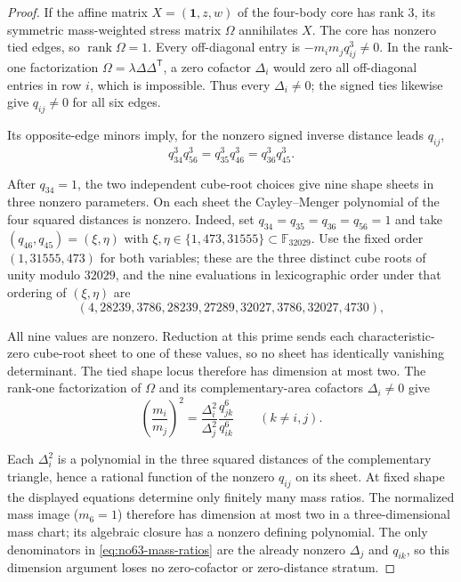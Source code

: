 \documentclass[11pt]{amsart}
\theoremstyle{remark}
\newcommand{\Needspace}[1]{\par\ifdim\dimexpr\pagegoal-\pagetotal\relax<#1\newpage\fi}
\begin{document}
\begin{proof}

If the affine matrix $X=(\boldsymbol1,z,w)$ of the four-body
core has rank 3, its symmetric mass-weighted stress matrix
$\Omega$ annihilates $X$. The core has nonzero tied edges, so
$\operatorname{rank}\Omega=1$. Every off-diagonal entry is
$-m_im_jq_{ij}^3\ne0$. In the rank-one factorization
$\Omega=\lambda\Delta\Delta^{\mathsf T}$, a zero cofactor
$\Delta_i$ would zero all off-diagonal entries in row $i$,
which is impossible. Thus every $\Delta_i\ne0$; the signed
ties likewise give $q_{ij}\ne0$ for all six edges.

Its opposite-edge minors imply, for the nonzero signed inverse
distance leads $q_{ij}$,
\begin{equation}\label{eq:no63-opposite-edges}
q_{34}^3q_{56}^3=q_{35}^3q_{46}^3=q_{36}^3q_{45}^3.
\end{equation}

\Needspace{14\baselineskip}
After $q_{34}=1$, the two independent cube-root choices give
nine shape sheets in three nonzero parameters. On each sheet
the Cayley--Menger polynomial of the four squared distances is
nonzero. Indeed, set $q_{34}=q_{35}=q_{36}=q_{56}=1$ and take
$(q_{46},q_{45})=(\xi,\eta)$ with
$\xi,\eta\in\{1,473,31555\}\subset\mathbb F_{32029}$. Use the
fixed order $(1,31555,473)$ for both variables; these are the three
distinct cube roots of unity modulo $32029$, and the nine evaluations
in lexicographic order under that ordering of $(\xi,\eta)$ are
\begin{equation}\label{eq:no63-cm-witness}
(4,28239,3786,28239,27289,32027,3786,32027,4730),
\end{equation}

All nine values are nonzero. Reduction at this prime sends each
characteristic-zero cube-root sheet to one of these values, so
no sheet has identically vanishing determinant. The tied shape
locus therefore has dimension at most two. The rank-one
factorization of $\Omega$ and its complementary-area cofactors
$\Delta_i\ne0$ give
\begin{equation}\label{eq:no63-mass-ratios}
\left(\frac{m_i}{m_j}\right)^2
=\frac{\Delta_i^2}{\Delta_j^2}
\frac{q_{jk}^6}{q_{ik}^6}\qquad(k\ne i,j).
\end{equation}

Each $\Delta_i^2$ is a polynomial in the three squared
distances of the complementary triangle, hence a rational
function of the nonzero $q_{ij}$ on its sheet. At fixed shape
the displayed equations determine only finitely many mass
ratios. The normalized mass image ($m_6=1$) therefore has
dimension at most two in a three-dimensional mass chart; its
algebraic closure has a nonzero defining polynomial. The only
denominators in \eqref{eq:no63-mass-ratios} are the already
nonzero $\Delta_j$ and $q_{ik}$, so this dimension argument
loses no zero-cofactor or zero-distance stratum.


\end{proof}
\end{document}
